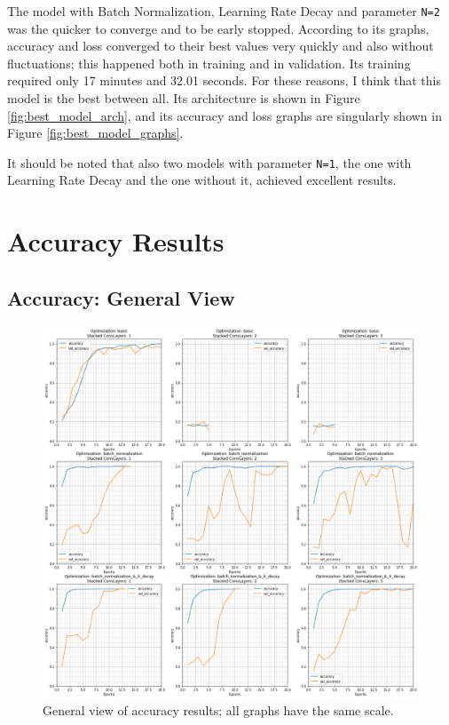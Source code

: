 \documentclass{article}
\begin{document}
The model with Batch Normalization, Learning Rate Decay and parameter \texttt{N=2} was the quicker to converge and to be early stopped.
According to its graphs, accuracy and loss converged to their best values very quickly and also without fluctuations; this happened both in training and in validation.
Its training required only 17 minutes and 32.01 seconds.
For these reasons, I think that this model is the best between all.
Its architecture is shown in Figure \ref{fig:best_model_arch}, and its accuracy and loss graphs are singularly shown in Figure \ref{fig:best_model_graphs}.

It should be noted that also two models with parameter \texttt{N=1}, the one with Learning Rate Decay and the one without it, achieved excellent results.

\newpage

\appendix

\section{Accuracy Results}
\label{app:accuracy}

\subsection{Accuracy: General View}
\begin{figure}[h]
    \centering
    \centerline{
        \includegraphics[width=0.65\paperwidth]{accuracy_general}
    }
    \caption{General view of accuracy results; all graphs have the same scale.}
    \label{fig:accuracy_general}
\end{figure}
\end{document}
